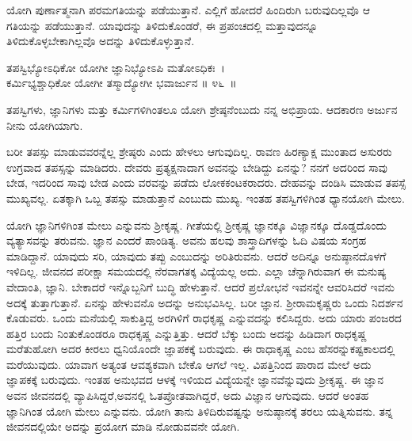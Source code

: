 ಯೋಗಿ ಪುರ್ಣಾತ್ಮನಾಗಿ ಪರಮಗತಿಯನ್ನು ಪಡೆಯುತ್ತಾನೆ. ಎಲ್ಲಿಗೆ ಹೋದರೆ ಹಿಂದಿರುಗಿ ಬರುವುದಿಲ್ಲವೊ ಆ ಗತಿಯನ್ನು ಪಡೆಯುತ್ತಾನೆ. ಯಾವುದನ್ನು ತಿಳಿದುಕೊಂಡರೆ, ಈ ಪ್ರಪಂಚದಲ್ಲಿ ಮತ್ತಾವುದನ್ನೂ ತಿಳಿದುಕೊಳ್ಳಬೇಕಾಗಿಲ್ಲವೊ ಅದನ್ನು ತಿಳಿದುಕೊಳ್ಳುತ್ತಾನೆ.

\begin{shloka}
ತಪಸ್ವಿಭ್ಯೋಽಧಿಕೋ ಯೋಗೀ ಜ್ಞಾನಿಭ್ಯೋಽಪಿ ಮತೋಽಧಿಕಃ~।\\ಕರ್ಮಿಭ್ಯಶ್ಚಾಧಿಕೋ ಯೋಗೀ ತಸ್ಮಾದ್ಯೋಗೀ ಭವಾರ್ಜುನ \hfill॥ ೪೬~॥
\end{shloka}

\begin{artha}
ತಪಸ್ವಿಗಳು, ಜ್ಞಾನಿಗಳು ಮತ್ತು ಕರ್ಮಿಗಳಿಗಿಂತಲೂ ಯೋಗಿ ಶ್ರೇಷ್ಠನೆಂಬುದು ನನ್ನ ಅಭಿಪ್ರಾಯ. ಆದಕಾರಣ ಅರ್ಜುನ ನೀನು ಯೋಗಿಯಾಗು.
\end{artha}

ಬರೀ ತಪಸ್ಸು ಮಾಡುವವರನ್ನೆಲ್ಲ ಶ್ರೇಷ್ಠರು ಎಂದು ಹೇಳಲು ಆಗುವುದಿಲ್ಲ. ರಾವಣ ಹಿರಣ್ಯಾಕ್ಷ ಮುಂತಾದ ಅಸುರರು ಉಗ್ರವಾದ ತಪಸ್ಸನ್ನು ಮಾಡಿದರು. ದೇವರು ಪ್ರತ್ಯಕ್ಷನಾದಾಗ ಅವನನ್ನು ಬೇಡಿದ್ದು ಏನನ್ನು? ನನಗೆ ಅದರಿಂದ ಸಾವು ಬೇಡ, ಇದರಿಂದ ಸಾವು ಬೇಡ ಎಂದು ವರವನ್ನು ಪಡೆದು ಲೋಕಕಂಟಕರಾದರು. ದೇಹವನ್ನು ದಂಡಿಸಿ ಮಾಡುವ ತಪಸ್ಸೆ ಮುಖ್ಯವಲ್ಲ. ಏತಕ್ಕಾಗಿ ಒಬ್ಬ ತಪಸ್ಸು ಮಾಡುತ್ತಾನೆ ಎಂಬುದು ಮುಖ್ಯ. ಇಂತಹ ತಪಸ್ವಿಗಳಿಗಿಂತ ಧ್ಯಾನಯೋಗಿ ಮೇಲು.

ಯೋಗಿ ಜ್ಞಾನಿಗಳಿಗಿಂತ ಮೇಲು ಎನ್ನುವನು ಶ‍್ರೀಕೃಷ್ಣ. ಗೀತೆಯಲ್ಲಿ ಶ‍್ರೀಕೃಷ್ಣ ಜ್ಞಾನಕ್ಕೂ ವಿಜ್ಞಾನಕ್ಕೂ ದೊಡ್ಡದೊಂದು ವ್ಯತ್ಯಾಸವನ್ನು ತರುವನು. ಜ್ಞಾನ ಎಂದರೆ ಪಾಂಡಿತ್ಯ. ಅವನು ಹಲವು ಶಾಸ್ತ್ರಾದಿಗಳನ್ನು ಓದಿ ವಿಷಯ ಸಂಗ್ರಹ ಮಾಡಿದ್ದಾನೆ. ಯಾವುದು ಸರಿ, ಯಾವುದು ತಪ್ಪು ಎಂಬುದನ್ನು ಅರಿತಿರುವನು. ಆದರೆ ಅದಿನ್ನೂ ಅನುಷ್ಠಾನದೊಳಗೆ ಇಳಿದಿಲ್ಲ. ಜೀವನದ ಪರೀಕ್ಷಾ ಸಮಯದಲ್ಲಿ ನೆರವಾಗತಕ್ಕ ವಿದ್ಯೆಯಲ್ಲ ಅದು. ಎಲ್ಲಾ ಚೆನ್ನಾಗಿರುವಾಗ ಈ ಮನುಷ್ಯ ವೇದಾಂತಿ, ಜ್ಞಾನಿ. ಬೇಕಾದರೆ ಇನ್ನೊಬ್ಬನಿಗೆ ಬುದ್ಧಿ ಹೇಳುತ್ತಾನೆ. ಆದರೆ ಪ್ರಲೋಭನೆ ಇವನನ್ನೇ ಆವರಿಸಿದರೆ ಇವನು ಅದಕ್ಕೆ ತುತ್ತಾಗುತ್ತಾನೆ. ಏನನ್ನು ಹೇಳುವನೊ ಅದನ್ನು ಅನುಭವಿಸಿಲ್ಲ. ಬರೀ ಜ್ಞಾನ. ಶ‍್ರೀರಾಮಕೃಷ್ಣರು ಒಂದು ನಿದರ್ಶನ ಕೊಡುವರು. ಒಂದು ಮನೆಯಲ್ಲಿ ಸಾಕುತ್ತಿದ್ದ ಅರಗಿಳಿಗೆ ರಾಧಕೃಷ್ಣ ಎನ್ನುವದನ್ನು ಕಲಿಸಿದ್ದರು. ಅದು ಯಾರು ಪಂಜರದ ಹತ್ತಿರ ಬಂದು ನಿಂತುಕೊಂಡರೂ ರಾಧಕೃಷ್ಣ ಎನ್ನುತ್ತಿತ್ತು. ಆದರೆ ಬೆಕ್ಕು ಬಂದು ಅದನ್ನು ಹಿಡಿದಾಗ ರಾಧಕೃಷ್ಣ ಮರೆತುಹೋಗಿ ಅದರ ಕೀರಲು ಧ್ವನಿಯೊಂದೇ ಜ್ಞಾಪಕಕ್ಕೆ ಬರುವುದು. ಈ ರಾಧಾಕೃಷ್ಣ ಎಂಬ ಹೆಸರನ್ನು\break ಕಷ್ಟಕಾಲದಲ್ಲಿ ಮರೆಯುವುದು. ಯಾವಾಗ ಅತ್ಯಂತ ಆವಶ್ಯಕವಾಗಿ ಬೇಕೊ ಆಗಲೆ ಇಲ್ಲ. ವಿಪತ್ತಿನಿಂದ ಪಾರಾದ ಮೇಲೆ ಅದು ಜ್ಞಾಪಕಕ್ಕೆ ಬರುವುದು. ಇಂತಹ ಅನುಭವದ ಆಳಕ್ಕೆ ಇಳಿಯದ ವಿದ್ಯೆಯನ್ನೇ ಜ್ಞಾನವೆನ್ನುವುದು ಶ‍್ರೀಕೃಷ್ಣ. ಈ ಜ್ಞಾನ ಅವನ ಜೀವನದಲ್ಲಿ ವ್ಯಾಪಿಸಿದ್ದರೆ,\break ಅವನಲ್ಲಿ ಓತಪ್ರೋತವಾಗಿದ್ದರೆ, ಅದು ವಿಜ್ಞಾನ ಆಗುವುದು. ಆದರೆ ಅಂತಹ ಜ್ಞಾನಿಗಿಂತ ಯೋಗಿ ಮೇಲು ಎನ್ನುವನು. ಯೋಗಿ ತಾನು ತಿಳಿದಿರುವಷ್ಟನ್ನು ಅನುಷ್ಠಾನಕ್ಕೆ ತರಲು ಯತ್ನಿಸುವನು. ತನ್ನ ಜೀವನದಲ್ಲಿಯೇ ಅದನ್ನು ಪ್ರಯೋಗ ಮಾಡಿ ನೋಡುವವನೇ ಯೋಗಿ.

